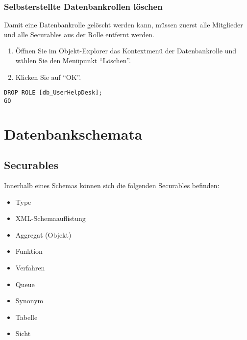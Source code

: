         \subsubsection{Selbsterstellte Datenbankrollen löschen}
          Damit eine Datenbankrolle gelöscht werden kann, müssen zuerst alle
          Mitglieder und alle Securables aus der Rolle entfernt werden.
          \begin{enumerate}
            \item Öffnen Sie im Objekt-Explorer das Kontextmenü der
            Datenbankrolle und wählen Sie den Menüpunkt \enquote{Löschen}.
            \item Klicken Sie auf \enquote{OK}.
          \end{enumerate}
          \begin{lstlisting}[language=ms_sql,caption={Entfernen einer
          Datebankrolle},label=sql19_21]
DROP ROLE [db_UserHelpDesk];
GO
          \end{lstlisting}
          \begin{literaturinternet}
            \item \cite{ms174988}
          \end{literaturinternet}
    \section{Datenbankschemata}
      \subsection{Securables}
        Innerhalb eines Schemas können sich die folgenden Securables befinden:
        \begin{itemize}
          \item Type 
          \item XML-Schemaauflistung
          \item Aggregat (Objekt)
          \item Funktion
          \item Verfahren
          \item Queue 
          \item Synonym
          \item Tabelle
          \item Sicht
        \end{itemize}
        \begin{literaturinternet}
          \item \cite{ms190401}
        \end{literaturinternet}
